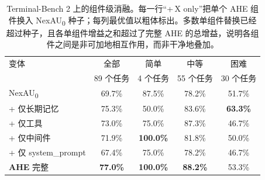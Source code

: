\begin{table}[htbp]
    \centering
    \small
     \vspace{\baselineskip}
    \caption{Terminal-Bench 2 上的组件级消融。每一行``+\,X only''把单个 AHE 组件换入 NexAU\textsubscript{0} 种子；每列最优值以粗体标出。多数单组件替换已经超过种子，且各单组件增益之和超过了完整 AHE 的总增益，说明各组件之间是非可加地相互作用，而非干净地叠加。}
    \label{tab:ablations}
    \begin{tabular}{lcccc}
        \toprule
        变体 & 全部 & 简单 & 中等 & 困难 \\
                & {\scriptsize 89 个任务} & {\scriptsize 4 个任务} & {\scriptsize 55 个任务} & {\scriptsize 30 个任务} \\
        \midrule
        NexAU\textsubscript{0} & 69.7\% & 87.5\% & 78.2\% & 51.7\% \\
        \addlinespace
        + 仅长期记忆         & 75.3\% & 50.0\% & 83.6\% & \textbf{63.3\%} \\
        + 仅工具           & 73.0\% & 75.0\% & 87.3\% & 46.7\% \\
        + 仅中间件     & 71.9\% & \textbf{100.0\%} & 81.8\% & 50.0\% \\
        + 仅 system\_prompt & 67.4\% & 75.0\% & 78.2\% & 46.7\% \\
        \addlinespace
        \textbf{AHE} 完整     & \textbf{77.0\%} & \textbf{100.0\%} & \textbf{88.2\%} & 53.3\% \\
        \bottomrule
    \end{tabular}
\end{table}
